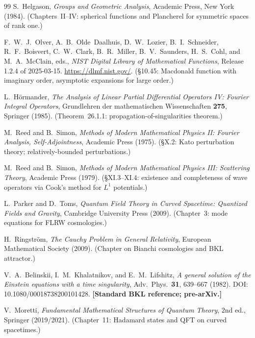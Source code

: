 \documentclass[12pt,letterpaper]{article}
\begin{document}
\begin{thebibliography}{99}
  S.~Helgason,
  \textit{Groups and Geometric Analysis},
  Academic Press, New York (1984).
  (Chapters~II--IV: spherical functions and Plancherel for
  symmetric spaces of rank one.)


  F.~W.~J.~Olver, A.~B.~Olde~Daalhuis, D.~W.~Lozier, B.~I.~Schneider,
  R.~F.~Boisvert, C.~W.~Clark, B.~R.~Miller, B.~V.~Saunders,
  H.~S.~Cohl, and M.~A.~McClain, eds.,
  \textit{NIST Digital Library of Mathematical Functions},
  Release 1.2.4 of 2025-03-15.
  \url{https://dlmf.nist.gov/}.
  (\S10.45: Macdonald function with imaginary order, asymptotic
  expansions for large order.)

  L.~H\"{o}rmander,
  \textit{The Analysis of Linear Partial Differential Operators IV:
  Fourier Integral Operators},
  Grundlehren der mathematischen Wissenschaften \textbf{275},
  Springer (1985).
  (Theorem~26.1.1: propagation-of-singularities theorem.)

  M.~Reed and B.~Simon,
  \textit{Methods of Modern Mathematical Physics II:
  Fourier Analysis, Self-Adjointness},
  Academic Press (1975).
  (\S X.2: Kato perturbation theory; relatively-bounded perturbations.)

  M.~Reed and B.~Simon,
  \textit{Methods of Modern Mathematical Physics III: Scattering
  Theory},
  Academic Press (1979).
  (\S XI.3--XI.4: existence and completeness of wave operators
  via Cook's method for $L^{1}$ potentials.)

  L.~Parker and D.~Toms,
  \textit{Quantum Field Theory in Curved Spacetime:
  Quantized Fields and Gravity},
  Cambridge University Press (2009).
  (Chapter~3: mode equations for FLRW cosmologies.)

  H.~Ringstr\"{o}m,
  \textit{The Cauchy Problem in General Relativity},
  European Mathematical Society (2009).
  (Chapter on Bianchi cosmologies and BKL attractor.)

  V.~A.~Belinskii, I.~M.~Khalatnikov, and E.~M.~Lifshitz,
  \textit{A general solution of the Einstein equations with a time singularity},
  Adv.~Phys.\ \textbf{31}, 639--667 (1982).
  DOI: 10.1080/00018738200101428.
  \textbf{[Standard BKL reference; pre-arXiv.]}

  V.~Moretti,
  \textit{Fundamental Mathematical Structures of Quantum Theory},
  2nd ed., Springer (2019/2021).
  (Chapter~11: Hadamard states and QFT on curved spacetimes.)


\end{thebibliography}
\end{document}
